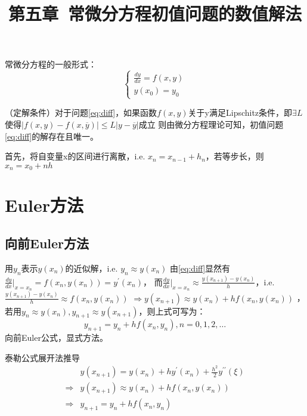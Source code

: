 \documentclass{article}
\begin{document}
\title{第五章\ 常微分方程初值问题的数值解法}
\author{}
\date{}
\maketitle

常微分方程的一般形式：
\begin{equation}
    \left\{
        \begin{array}{lr}
            \frac{dy}{dx} = f(x, y) \\
            y(x_0) = y_0
        \end{array}
        \right. 
\label{eq:diff}
\end{equation}

（定解条件）对于问题\ref{eq:diff}，如果函数$f(x,y)$关于y满足Lipschitz条件，即$\exists L$使得$|f(x,y)-f(x,\overline{y})|\le L|y-\overline{y}|$成立
则由微分方程理论可知，初值问题\ref{eq:diff}的解存在且唯一。

首先，将自变量x的区间进行离散，i.e. $x_n = x_{n-1} + h_n$，若等步长，则$x_n = x_0 + nh$

\section{Euler方法}
\subsection{向前Euler方法}
用$y_n$表示$y(x_n)$的近似解，i.e. $y_n \approx y(x_n)$
由\ref{eq:diff}显然有$\frac{dy}{dx}|_{x=x_n} = f(x_n, y(x_n)) = y^{'}(x_n)$，
而$\frac{dy}{dx}|_{x=x_n} \approx \frac{y(x_{n+1}) - y(x_n)}{h}$，i.e. $\frac{y(x_{n+1}) - y(x_n)}{h} \approx f(x_n, y(x_n))$
$\Rightarrow y(x_{n+1}) \approx y(x_n) + hf(x_n, y(x_n))$ ，若用$y_n\approx y(x_n), y_{n+1}\approx y(x_{n+1})$，则上式可写为：
\begin{equation}
    y_{n+1}=y_n+hf(x_n, y_n), n=0,1,2,\dots 
    \label{eq:euler}
\end{equation}
向前Euler公式，显式方法。

泰勒公式展开法推导
\begin{equation*}
    \begin{split}
        &y(x_{n+1}) = y(x_n) + hy^{'}(x_n) +\frac{h^2}{2}y^{{'}{'}}(\xi) \\
        \Rightarrow& y(x_{n+1}) \approx y(x_n)+hf(x_n, y(x_n)) \\
        \Rightarrow& 
        y_{n+1} = y_n +hf(x_n, y_n)
    \end{split}
\end{equation*}
\end{document}
